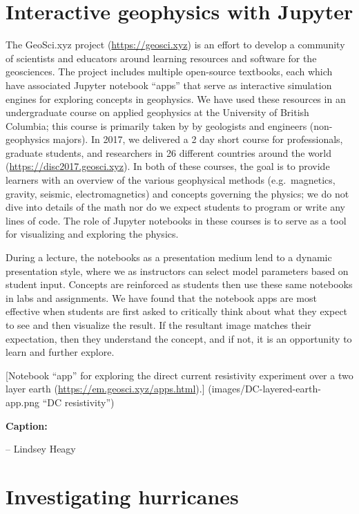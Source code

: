 \documentclass[]{book}
\begin{document}
\section{Interactive geophysics with
Jupyter}\label{interactive-geophysics-with-jupyter}

The GeoSci.xyz project (\url{https://geosci.xyz}) is an effort to
develop a community of scientists and educators around learning
resources and software for the geosciences. The project includes
multiple open-source textbooks, each which have associated Jupyter
notebook ``apps'' that serve as interactive simulation engines for
exploring concepts in geophysics. We have used these resources in an
undergraduate course on applied geophysics at the University of British
Columbia; this course is primarily taken by by geologists and engineers
(non-geophysics majors). In 2017, we delivered a 2 day short course for
professionals, graduate students, and researchers in 26 different
countries around the world (\url{https://disc2017.geosci.xyz}). In both
of these courses, the goal is to provide learners with an overview of
the various geophysical methods (e.g.~magnetics, gravity, seismic,
electromagnetics) and concepts governing the physics; we do not dive
into details of the math nor do we expect students to program or write
any lines of code. The role of Jupyter notebooks in these courses is to
serve as a tool for visualizing and exploring the physics.

During a lecture, the notebooks as a presentation medium lend to a
dynamic presentation style, where we as instructors can select model
parameters based on student input. Concepts are reinforced as students
then use these same notebooks in labs and assignments. We have found
that the notebook apps are most effective when students are first asked
to critically think about what they expect to see and then visualize the
result. If the resultant image matches their expectation, then they
understand the concept, and if not, it is an opportunity to learn and
further explore.

{[}Notebook ``app'' for exploring the direct current resistivity
experiment over a two layer earth
(\url{https://em.geosci.xyz/apps.html}).{]}
(images/DC-layered-earth-app.png ``DC resistivity'')

\textbf{Caption: }

-- Lindsey Heagy

\section{Investigating hurricanes}\label{investigating-hurricanes}
\end{document}
